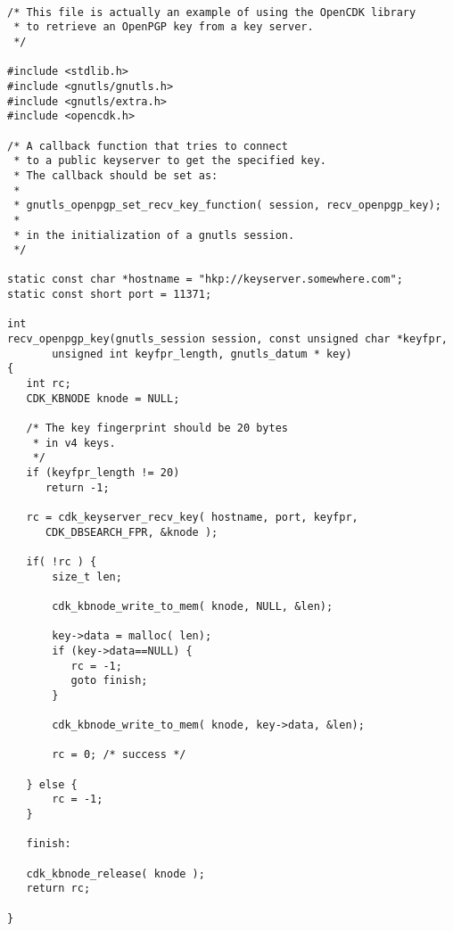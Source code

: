 \begin {verbatim}

/* This file is actually an example of using the OpenCDK library
 * to retrieve an OpenPGP key from a key server.
 */

#include <stdlib.h>
#include <gnutls/gnutls.h>
#include <gnutls/extra.h>
#include <opencdk.h>

/* A callback function that tries to connect
 * to a public keyserver to get the specified key.
 * The callback should be set as:
 *
 * gnutls_openpgp_set_recv_key_function( session, recv_openpgp_key);
 *
 * in the initialization of a gnutls session.
 */

static const char *hostname = "hkp://keyserver.somewhere.com";
static const short port = 11371;

int
recv_openpgp_key(gnutls_session session, const unsigned char *keyfpr, 
       unsigned int keyfpr_length, gnutls_datum * key)
{
   int rc;
   CDK_KBNODE knode = NULL;

   /* The key fingerprint should be 20 bytes
    * in v4 keys.
    */
   if (keyfpr_length != 20)
      return -1;

   rc = cdk_keyserver_recv_key( hostname, port, keyfpr, 
      CDK_DBSEARCH_FPR, &knode );

   if( !rc ) {
       size_t len;

       cdk_kbnode_write_to_mem( knode, NULL, &len);

       key->data = malloc( len);
       if (key->data==NULL) {
          rc = -1;
          goto finish;
       }

       cdk_kbnode_write_to_mem( knode, key->data, &len);

       rc = 0; /* success */

   } else {
       rc = -1;
   }

   finish:

   cdk_kbnode_release( knode );
   return rc;

}


\end{verbatim}
